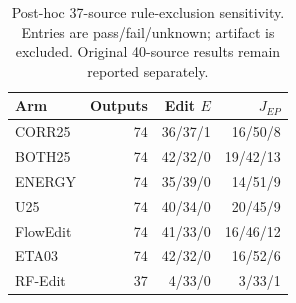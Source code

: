 \begin{table}[t]
\centering\small
\caption{Post-hoc 37-source rule-exclusion sensitivity. Entries are pass/fail/unknown; artifact is excluded. Original 40-source results remain reported separately.}
\label{tab:rule-exclusion}
\begin{tabular}{lrrr}
\toprule
Arm & Outputs & Edit $E$ & $J_{EP}$\\
\midrule
CORR25 & 74 & 36/37/1 & 16/50/8\\
BOTH25 & 74 & 42/32/0 & 19/42/13\\
ENERGY & 74 & 35/39/0 & 14/51/9\\
U25 & 74 & 40/34/0 & 20/45/9\\
FlowEdit & 74 & 41/33/0 & 16/46/12\\
ETA03 & 74 & 42/32/0 & 16/52/6\\
RF-Edit & 37 & 4/33/0 & 3/33/1\\
\bottomrule
\end{tabular}
\end{table}
